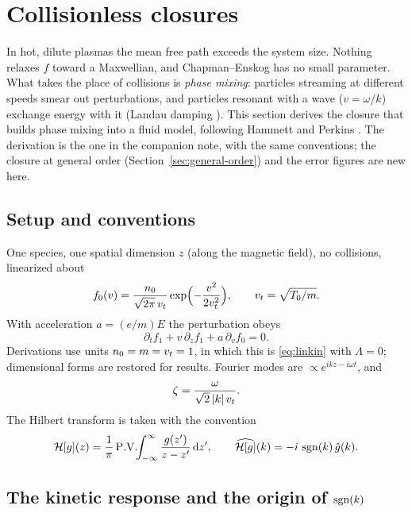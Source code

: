 \section{Collisionless closures}
\label{sec:collisionless}

In hot, dilute plasmas the mean free path exceeds the system size. Nothing
relaxes $f$ toward a Maxwellian, and Chapman--Enskog has no small
parameter. What takes the place of collisions is \emph{phase mixing}:
particles streaming at different speeds smear out perturbations, and
particles resonant with a wave ($v=\omega/k$) exchange energy with it
(Landau damping \cite{Landau46}). This section derives the closure that
builds phase mixing into a fluid model, following Hammett and Perkins
\cite{HP90,HDP92}. The derivation is the one in the companion note, with
the same conventions; the closure at general order
(Section~\ref{sec:general-order}) and the error figures are new here.

\subsection{Setup and conventions}

One species, one spatial dimension $z$ (along the magnetic field), no
collisions, linearized about
\[
  f_0(v)=\frac{n_0}{\sqrt{2\pi}\,v_t}\exp\Bigl(-\frac{v^2}{2v_t^2}\Bigr),
  \qquad v_t=\sqrt{T_0/m}.
\]
With acceleration $a=(e/m)E$ the perturbation obeys
\begin{equation}
  \partial_tf_1+v\,\partial_zf_1+a\,\partial_vf_0=0 .
  \label{eq:vlasov}
\end{equation}
Derivations use units $n_0=m=v_t=1$, in which this is \eqref{eq:linkin}
with $\Lambda=0$; dimensional forms are restored for results. Fourier modes
are $\propto e^{ikz-i\omega t}$, and
\begin{equation}
  \zeta=\frac{\omega}{\sqrt2\,|k|\,v_t}.
  \label{eq:zeta}
\end{equation}
The Hilbert transform is taken with the convention
\begin{equation}
  \mathcal{H}[g](z)=\frac1\pi\,\mathrm{P.V.}\!\!\int_{-\infty}^{\infty}\frac{g(z')}{z-z'}\,\mathrm{d} z',
  \qquad
  \widehat{\mathcal{H}[g]}(k)=-i\,\operatorname{sgn}(k)\,\hat g(k).
  \label{eq:hilbert}
\end{equation}

\subsection{The kinetic response and the origin of $\operatorname{sgn}(k)$}

